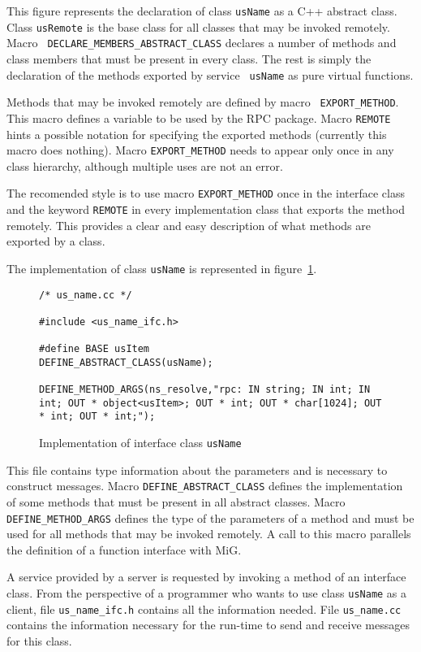 This figure represents the declaration of class {\tt usName} as a C++
abstract class. Class {\tt usRemote} is the base class for all classes
that may be invoked remotely. Macro {\tt
DECLARE\_MEMBERS\_ABSTRACT\_CLASS} declares a number
of methods and class members that must be present in every class. The
rest is simply the declaration of the methods exported by service {\tt
usName} as pure virtual functions. 

Methods that may be invoked remotely are defined by macro {\tt
EXPORT\_METHOD}. This macro defines a variable to be used by the RPC
package. Macro {\tt REMOTE} hints a possible notation for
specifying the exported methods (currently this macro does nothing).
Macro {\tt EXPORT\_METHOD} needs to appear only once in any class
hierarchy, although multiple uses are not an error. 

The recomended style is to use macro {\tt EXPORT\_METHOD} once in
the interface class and the keyword {\tt REMOTE} in every
implementation class that exports the method remotely. This provides a
clear and easy description of what methods are exported by a class.

The implementation of class {\tt usName} is represented in
figure~\ref{us_name}.

\begin{figure}[htbp]
{\footnotesize
\begin{verbatim}
/* us_name.cc */

#include <us_name_ifc.h>

#define BASE usItem
DEFINE_ABSTRACT_CLASS(usName);

DEFINE_METHOD_ARGS(ns_resolve,"rpc: IN string; IN int; IN int; OUT * object<usItem>; OUT * int; OUT * char[1024]; OUT * int; OUT * int;");
\end{verbatim}
}
\caption{Implementation of interface class {\tt usName}}
\label{us_name}
\end{figure}

This file contains type information about the parameters and is
necessary to construct messages. Macro {\tt DEFINE\_ABSTRACT\_CLASS}
defines the implementation of some methods that must be present in
all abstract classes. Macro {\tt DEFINE\_METHOD\_ARGS} defines the
type of the parameters of a method and must be used for all methods
that may be invoked remotely. A call to this macro parallels
the definition of a function interface with MiG.

A service provided by a server is requested by invoking a method of an
interface class. From the perspective of a programmer who wants to use
class {\tt usName} as a client, file {\tt us\_name\_ifc.h}
contains all the information needed. File {\tt us\_name.cc} contains
the information necessary for the run-time to send and receive messages
for this class.

